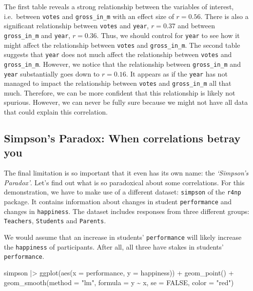 \documentclass[
  letterpaper,
]{krantz}
\makeatletter
\newenvironment{Shaded}{\begin{snugshade}}{\end{snugshade}}
\newcommand{\AttributeTok}[1]{\textcolor[rgb]{0.40,0.45,0.13}{#1}}
\newcommand{\ConstantTok}[1]{\textcolor[rgb]{0.56,0.35,0.01}{#1}}
\newcommand{\FunctionTok}[1]{\textcolor[rgb]{0.28,0.35,0.67}{#1}}
\newcommand{\NormalTok}[1]{\textcolor[rgb]{0.00,0.23,0.31}{#1}}
\newcommand{\SpecialCharTok}[1]{\textcolor[rgb]{0.37,0.37,0.37}{#1}}
\newcommand{\StringTok}[1]{\textcolor[rgb]{0.13,0.47,0.30}{#1}}
\newenvironment{kframe}{%
\medskip{}
\setlength{\fboxsep}{.8em}
 \def\at@end@of@kframe{}%
 \ifinner\ifhmode%
  \def\at@end@of@kframe{\end{minipage}}%
  \begin{minipage}{\columnwidth}%
 \fi\fi%
 \def\FrameCommand##1{\hskip\@totalleftmargin \hskip-\fboxsep
 \colorbox{shadecolor}{##1}\hskip-\fboxsep
     \hskip-\linewidth \hskip-\@totalleftmargin \hskip\columnwidth}%
 \MakeFramed {\advance\hsize-\width
   \@totalleftmargin\z@ \linewidth\hsize
   \@setminipage}}%
 {\par\unskip\endMakeFramed%
 \at@end@of@kframe}
\renewenvironment{Shaded}{\begin{kframe}}{\end{kframe}}
\makeatother
\begin{document}
The first table reveals a strong relationship between the variables of
interest, i.e.~between \texttt{votes} and \texttt{gross\_in\_m} with an
effect size of \(r = 0.56\). There is also a significant relationship
between \texttt{votes} and \texttt{year}, \(r = 0.37\) and between
\texttt{gross\_in\_m} and \texttt{year}, \(r = 0.36\). Thus, we should
control for \texttt{year} to see how it might affect the relationship
between \texttt{votes} and \texttt{gross\_in\_m}. The second table
suggests that \texttt{year} does not much affect the relationship
between \texttt{votes} and \texttt{gross\_in\_m}. However, we notice
that the relationship between \texttt{gross\_in\_m} and \texttt{year}
substantially goes down to \(r = 0.16\). It appears as if the
\texttt{year} has not managed to impact the relationship between
\texttt{votes} and \texttt{gross\_in\_m} all that much. Therefore, we
can be more confident that this relationship is likely not spurious.
However, we can never be fully sure because we might not have all data
that could explain this correlation.

\subsection{Simpson's Paradox: When correlations betray
you}\label{sec-simpsons-paradox}

The final limitation is so important that it even has its own name: the
\emph{`Simpson's Paradox'}. Let's find out what is so paradoxical about
some correlations. For this demonstration, we have to make use of a
different dataset: \texttt{simpson} of the \texttt{r4np} package. It
contains information about changes in student \texttt{performance} and
changes in \texttt{happiness}. The dataset includes responses from three
different groups: \texttt{Teachers}, \texttt{Students} and
\texttt{Parents}.

We would assume that an increase in students' \texttt{performance} will
likely increase the \texttt{happiness} of participants. After all, all
three have stakes in students' \texttt{performance}.

\begin{Shaded}
\begin{Highlighting}[]
\NormalTok{simpson }\SpecialCharTok{|\textgreater{}}
  \FunctionTok{ggplot}\NormalTok{(}\FunctionTok{aes}\NormalTok{(}\AttributeTok{x =}\NormalTok{ performance,}
             \AttributeTok{y =}\NormalTok{ happiness)) }\SpecialCharTok{+}
  \FunctionTok{geom\_point}\NormalTok{() }\SpecialCharTok{+}
  \FunctionTok{geom\_smooth}\NormalTok{(}\AttributeTok{method =} \StringTok{"lm"}\NormalTok{,}
              \AttributeTok{formula =}\NormalTok{ y }\SpecialCharTok{\textasciitilde{}}\NormalTok{ x,}
              \AttributeTok{se =} \ConstantTok{FALSE}\NormalTok{,}
              \AttributeTok{color =} \StringTok{"red"}\NormalTok{)}
\end{Highlighting}
\end{Shaded}
\end{document}
